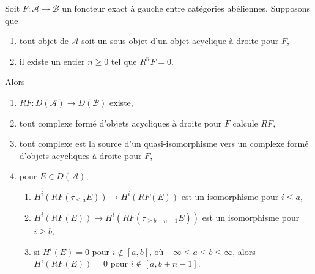 \begin{lemma}
\label{lemma-unbounded-right-derived}
Soit $F : \mathcal{A} \to \mathcal{B}$ un foncteur exact à gauche entre
catégories abéliennes. Supposons que
\begin{enumerate}
\item tout objet de $\mathcal{A}$ soit un sous-objet d'un objet acyclique à
droite pour $F$,
\item il existe un entier $n \geq 0$ tel que $R^nF = 0$.
\end{enumerate}
Alors
\begin{enumerate}
\item $RF : D(\mathcal{A}) \to D(\mathcal{B})$ existe,
\item tout complexe formé d'objets acycliques à droite pour $F$ calcule $RF$,
\item tout complexe est la source d'un quasi-isomorphisme vers un complexe
formé d'objets acycliques à droite pour $F$,
\item pour $E \in D(\mathcal{A})$,
\begin{enumerate}
\item $H^i(RF(\tau_{\leq a}E)) \to H^i(RF(E))$ est un isomorphisme
pour $i \leq a$,
\item $H^i(RF(E)) \to H^i(RF(\tau_{\geq b - n + 1}E))$ est un isomorphisme
pour $i \geq b$,
\item si $H^i(E) = 0$ pour $i \not \in [a, b]$, où
$-\infty \leq a \leq b \leq \infty$, alors $H^i(RF(E)) = 0$
pour $i \not \in [a, b + n - 1]$.
\end{enumerate}
\end{enumerate}
\end{lemma}


